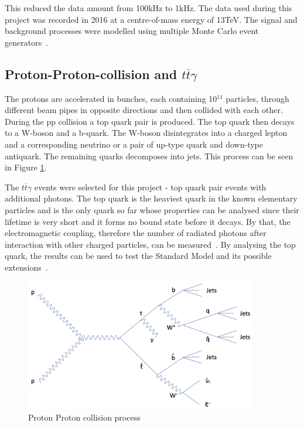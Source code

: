 \documentclass[11pt]{scrartcl}
\begin{document}
This reduced the data amount from 100kHz to 1kHz. The data used during this project was recorded in 2016 at a centre-of-mass energy of 13TeV. The signal and background processes were modelled using multiple Monte Carlo event generators~\cite{CMS21}. 

	\subsection{Proton-Proton-collision and $t\overline{t}\gamma$}
	 \label{sec:PPprocess}
	The protons are accelerated in bunches, each containing 10$^{11}$ particles, through different beam pipes in opposite directions and then collided with each other. During the pp collision a top quark pair is produced. The top quark then decays to a W-boson and a b-quark. The W-boson disintegrates into a charged lepton and a corresponding neutrino or a pair of up-type quark and down-type antiquark. The remaining quarks decomposes into jets. This process can be seen in Figure \ref{fig:PPprocess}.
	
	The $t\overline{t}\gamma$ events were selected for this project - top quark pair events with additional photons. The top quark is the heaviest quark in the known elementary particles and is the only quark so far whose properties can be analysed since their lifetime is very short and it forms no bound state before it decays. By that, the electromagnetic coupling, therefore the number of radiated photons after interaction with other charged particles, can be measured~\cite{TTG}. By analysing the top quark, the results can be used to test the Standard Model and its possible extensions~\cite{ATLAS}.
	
	\begin{figure}[H]
	\centering
	\includegraphics[width=0.9\textwidth]{figures/PP_process.png}
	\caption{Proton Proton collision process}
 	\label{fig:PPprocess}
	\end{figure}
	
\end{document}
